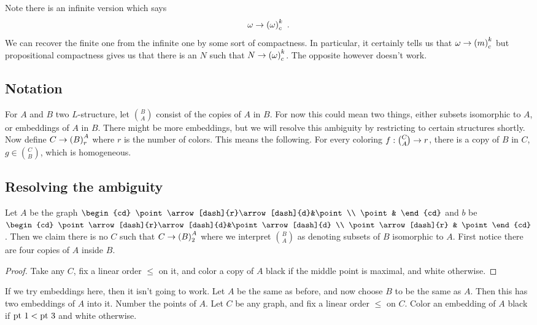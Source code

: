 \documentclass{amsart}
\begin{document}
Note there is an infinite version which says
\begin{equation}
\omega \rightarrow \left( \omega \right)^k_c \ .
\end{equation}
We can recover the finite one from the infinite one by some sort of compactness. In
particular, it certainly tells us that $\omega \rightarrow \left( m \right)^k_c$ but
propositional compactness gives us that there is an $N$ such that $N\rightarrow\left( \omega
\right)_c^k$. The opposite however doesn't work.

\subsection{Notation}

For $A$ and $B$ two $L$-structure, let $\binom{B}{A}$ consist of the copies of $A$ in $B$.
For now this could mean two things, either subsets isomorphic to $A$, or embeddings of $A$
in $B$. There might be more embeddings, but we will resolve this ambiguity by restricting
to certain structures shortly.
Now define $C\rightarrow\left( B \right)^A_r$ where $r$ is the number of colors. 
This means the following. For every coloring $f:\binom{C}{A}\rightarrow r$, there is a copy of
$B$ in $C$, $g\in \binom{C}{B}$, which is homogeneous.

\subsection{Resolving the ambiguity}

\begin{exm}
Let $A$ be the graph $
\begin{cd}
\point \arrow[dash]{r}\arrow[dash]{d}&\point \\ \point & 
\end{cd}$
and $b$ be $
\begin{cd}
\point \arrow[dash]{r}\arrow[dash]{d}&\point \arrow[dash]{d} \\ \point \arrow[dash]{r} & \point
\end{cd}$.
Then we claim there is no $C$ such that $C\rightarrow \left( B \right)_2^A$ where we interpret
$\binom{B}{A}$ as denoting subsets of $B$ isomorphic to $A$. First notice there are four
copies of $A$ inside $B$.
\begin{proof}
Take any $C$, fix a linear order $\leq$ on it, and color a copy of $A$ black if the middle
point is maximal, and white otherwise.
\end{proof}
If we try embeddings here, then it isn't going to work. Let $A$ be the same as before, and
now choose $B$ to be the same as $A$. Then this has two embeddings of $A$ into it.
Number the points of $A$.
Let $C$ be any graph, and fix a linear order $\leq$ on $C$. Color an embedding of $A$
black if $\text{pt} \ 1 < \text{pt} \ 3$ and white otherwise.
\end{exm}
\end{document}
